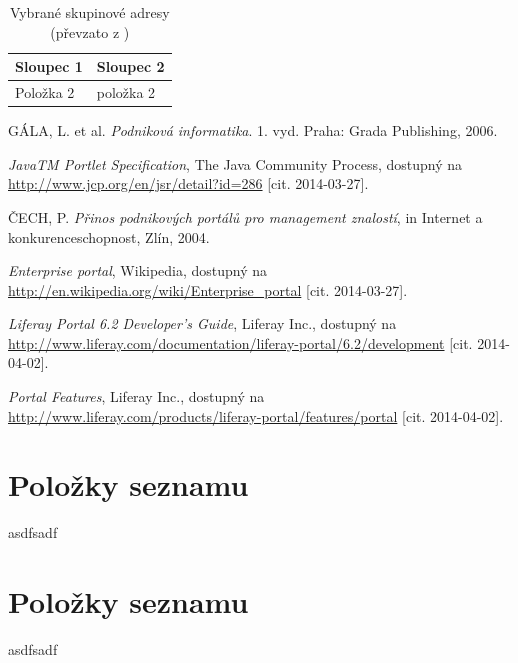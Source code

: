 \documentclass{fithesis}
\begin{document}
\begin{table}
\centering
\begin{tabular}{|p{3cm}|p{8cm}|}
\hline Sloupec 1 & Sloupec 2 \\
\hline Položka 2 & položka 2 \\
\hline
\end{tabular}
\caption{Vybrané skupinové adresy (převzato z \cite{satrapa-ipv6})}
\end{table}




\begin{thebibliography}{0}

GÁLA, L. et al. \textit{Podniková informatika}. 1. vyd. Praha: Grada Publishing, 2006. 

\textit{JavaTM Portlet Specification}, The Java Community Process, dostupný na \url{http://www.jcp.org/en/jsr/detail?id=286} [cit. 2014-03-27].

ČECH, P. \textit {Přinos podnikových portálů pro management znalostí}, in Internet a konkurenceschopnost, Zlín, 2004.

\textit{Enterprise portal}, Wikipedia, dostupný na \url{http://en.wikipedia.org/wiki/Enterprise_portal} [cit. 2014-03-27].

\textit{Liferay Portal 6.2 Developer's Guide}, Liferay Inc., dostupný na \url{http://www.liferay.com/documentation/liferay-portal/6.2/development} [cit. 2014-04-02].

\textit{Portal Features}, Liferay Inc., dostupný na \url{http://www.liferay.com/products/liferay-portal/features/portal} [cit. 2014-04-02].






\end{thebibliography}


\newpage
\appendix
\chapter{Položky seznamu}
asdfsadf

\chapter{Položky seznamu}
asdfsadf
\end{document}
